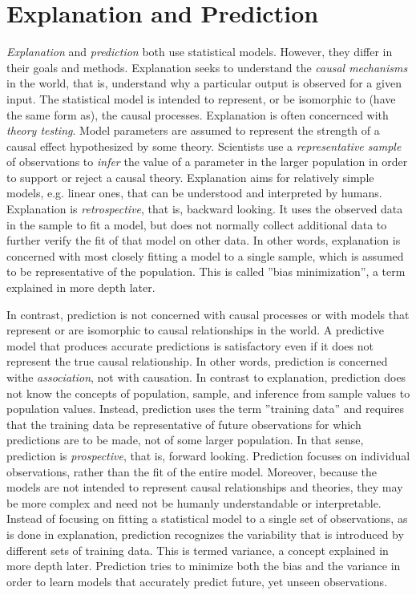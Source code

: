 \section{Explanation and Prediction}

\emph{Explanation} and \emph{prediction} both use statistical models. However, they differ in their goals and methods. Explanation seeks to understand the \emph{causal mechanisms} in the world, that is, understand why a particular output is observed for a given input. The statistical model is intended to represent, or be isomorphic to (have the same form as), the causal processes. Explanation is often concernced with \emph{theory testing}. Model parameters are assumed to represent the strength of a causal effect hypothesized by some theory. Scientists use a \emph{representative sample} of observations to \emph{infer} the value of a parameter in the larger population in order to support or reject a causal theory. Explanation aims for relatively simple models, e.g. linear ones, that can be understood and interpreted by humans. Explanation is \emph{retrospective}, that is, backward looking. It uses the observed data in the sample to fit a model, but does not normally collect additional data to further verify the fit of that model on other data. In other words, explanation is concerned with most closely fitting a model to a single sample, which is assumed to be representative of the population. This is called ''bias minimization'', a term explained in more depth later. 

In contrast, prediction is not concerned with causal processes or with models that represent or are isomorphic to causal relationships in the world. A predictive model that produces accurate predictions is satisfactory even if it does not represent the true causal relationship. In other words, prediction is concerned withe \emph{association}, not with causation. In contrast to explanation, prediction does not know the concepts of population, sample, and inference from sample values to population values. Instead, prediction uses the term ''training data'' and requires that the training data be representative of future observations for which predictions are to be made, not of some larger population. In that sense, prediction is \emph{prospective}, that is, forward looking. Prediction focuses on individual observations, rather than the fit of the entire model. Moreover, because the models are not intended to represent causal relationships and theories, they may be more complex and need not be humanly understandable or interpretable. Instead of focusing on fitting a statistical model to a single set of observations, as is done in explanation, prediction recognizes the variability that is introduced by different sets of training data. This is termed variance, a concept explained in more depth later. Prediction tries to minimize both the bias and the variance in order to learn models that accurately predict future, yet unseen observations.

